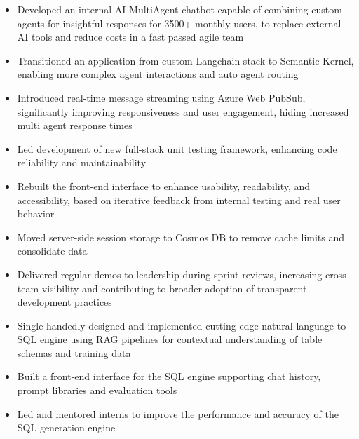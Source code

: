 \documentclass[11pt]{article}       %
\begin{document}
\begin{itemize}
    
        \item Developed an internal AI MultiAgent chatbot capable of combining custom agents for insightful responses for 3500+ monthly users, to replace external AI tools and reduce costs in a fast passed agile team
    
        \item Transitioned an application from custom Langchain stack to Semantic Kernel, enabling more complex agent interactions and auto agent routing
    
        \item Introduced real-time message streaming using Azure Web PubSub, significantly improving responsiveness and user engagement, hiding increased multi agent response times
    
        \item Led development of new full-stack unit testing framework, enhancing code reliability and maintainability
    
        \item Rebuilt the front-end interface to enhance usability, readability, and accessibility, based on iterative feedback from internal testing and real user behavior
    
        \item Moved server-side session storage to Cosmos DB to remove cache limits and consolidate data
    
        \item Delivered regular demos to leadership during sprint reviews, increasing cross-team visibility and contributing to broader adoption of transparent development practices
    
        \item Single handedly designed and implemented cutting edge natural language to SQL engine using RAG pipelines for contextual understanding of table schemas and training data
    
        \item Built a front-end interface for the SQL engine supporting chat history, prompt libraries and evaluation tools
    
        \item Led and mentored interns to improve the performance and accuracy of the SQL generation engine
    
\end{itemize}
\end{document}
